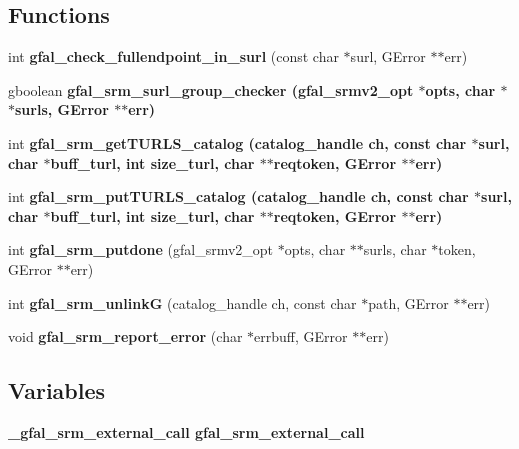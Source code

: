 \subsection*{Functions}
\begin{CompactItemize}
\item 
int \textbf{gfal\_\-check\_\-fullendpoint\_\-in\_\-surl} (const char $\ast$surl, GError $\ast$$\ast$err)\label{gfal__common__srm__internal__layer_8h_d12926fb068b66769f28f2c4fc177bd2}

\item 
gboolean \bf{gfal\_\-srm\_\-surl\_\-group\_\-checker} (gfal\_\-srmv2\_\-opt $\ast$opts, char $\ast$$\ast$surls, GError $\ast$$\ast$err)
\item 
int \bf{gfal\_\-srm\_\-get\-TURLS\_\-catalog} (catalog\_\-handle ch, const char $\ast$surl, char $\ast$buff\_\-turl, int size\_\-turl, char $\ast$$\ast$reqtoken, GError $\ast$$\ast$err)
\item 
int \bf{gfal\_\-srm\_\-put\-TURLS\_\-catalog} (catalog\_\-handle ch, const char $\ast$surl, char $\ast$buff\_\-turl, int size\_\-turl, char $\ast$$\ast$reqtoken, GError $\ast$$\ast$err)
\item 
int \textbf{gfal\_\-srm\_\-putdone} (gfal\_\-srmv2\_\-opt $\ast$opts, char $\ast$$\ast$surls, char $\ast$token, GError $\ast$$\ast$err)\label{gfal__common__srm__internal__layer_8h_0b73cfc8697e7ab0d68dc121047f405f}

\item 
int \textbf{gfal\_\-srm\_\-unlink\-G} (catalog\_\-handle ch, const char $\ast$path, GError $\ast$$\ast$err)\label{gfal__common__srm__internal__layer_8h_5f52f23ed20fcf63fe66e158a9748971}

\item 
void \textbf{gfal\_\-srm\_\-report\_\-error} (char $\ast$errbuff, GError $\ast$$\ast$err)\label{gfal__common__srm__internal__layer_8h_233010cc6723f86456203d1193fcb648}

\end{CompactItemize}
\subsection*{Variables}
\begin{CompactItemize}
\item 
\bf{\_\-gfal\_\-srm\_\-external\_\-call} \textbf{gfal\_\-srm\_\-external\_\-call}\label{gfal__common__srm__internal__layer_8h_67b12c7342043451fc5ce31b1a3d74fb}

\end{CompactItemize}


